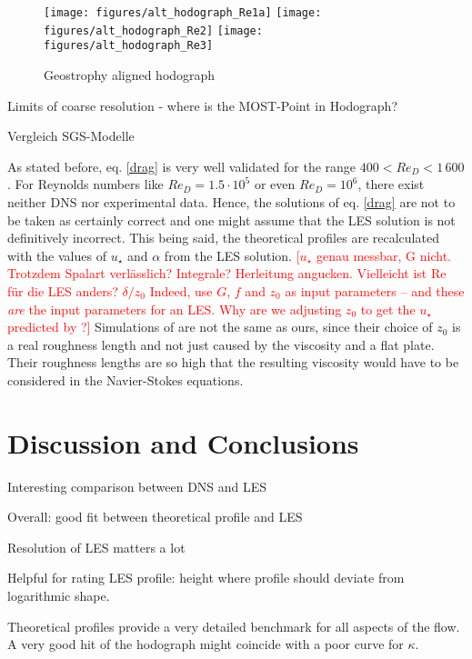 \documentclass[a4paper,11pt]{article}
\newcommand{\todo}[1]{\textcolor{red}{$[$#1$]$}}
\begin{document}
\begin{figure}
  \centerline{
	\texttt{[image: figures/alt\_hodograph\_Re1a]}
	\texttt{[image: figures/alt\_hodograph\_Re2]}
	\texttt{[image: figures/alt\_hodograph\_Re3]}
}
  \caption{Geostrophy aligned hodograph}
  \label{3Re_hodograph}
\end{figure}

Limits of coarse resolution - where is the MOST-Point in Hodograph?

Vergleich SGS-Modelle

As stated before, eq. \ref{drag} is very well validated for the range $400<Re_D<1\,600$ \citep{ansorge2014global}. For Reynolds numbers like $Re_D=1.5\cdot10^5$ or even $Re_D=10^6$, there exist neither DNS nor experimental data. Hence, the solutions of eq. \ref{drag} are not to be taken as certainly correct and one might assume that the LES solution is not definitively incorrect. This being said, the theoretical profiles are recalculated with the values of $u_\star$ and $\alpha$ from the LES solution. \todo{$u_\star$ genau messbar, G nicht. Trotzdem Spalart verlässlich? Integrale? Herleitung angucken. Vielleicht ist Re für die LES anders? $\delta/z_0$ Indeed, \cite{jiang2018large} use $G$, $f$ and $z_0$ as input parameters -- and these \textit{are} the input parameters for an LES. Why are we adjusting $z_0$ to get the $u_\star$ predicted by \cite{spalart1989theoretical}?} Simulations of \cite{jiang2018large} are not the same as ours, since their choice of $z_0$ is a real roughness length and not just caused by the viscosity and a flat plate. Their roughness lengths are so high that the resulting viscosity would have to be considered in the Navier-Stokes equations.


\section{Discussion and Conclusions}

Interesting comparison between DNS and LES

Overall: good fit between theoretical profile and LES

Resolution of LES matters a lot

Helpful for rating LES profile: height where profile should deviate from logarithmic shape.

Theoretical profiles provide a very detailed benchmark for all aspects of the flow. A very good hit of the hodograph might coincide with a poor curve for $\kappa$.



\end{document}
